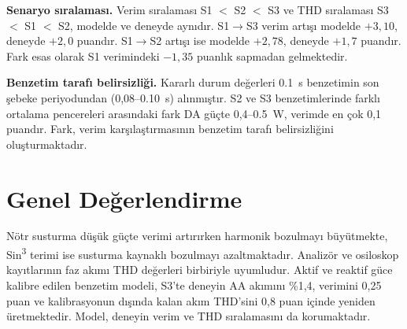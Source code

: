 \textbf{Senaryo sıralaması.} Verim sıralaması S1 $<$ S2 $<$ S3 ve THD sıralaması S3 $<$ S1 $<$ S2, modelde ve deneyde aynıdır. S1$\rightarrow$S3 verim artışı modelde $+3{,}10$, deneyde $+2{,}0$ puandır. S1$\rightarrow$S2 artışı ise modelde $+2{,}78$, deneyde $+1{,}7$ puandır. Fark esas olarak S1 verimindeki $-1{,}35$ puanlık sapmadan gelmektedir.

\textbf{Benzetim tarafı belirsizliği.} Kararlı durum değerleri \SI{0.1}{\second} benzetimin son şebeke periyodundan (0,08--\SI{0.10}{\second}) alınmıştır. S2 ve S3 benzetimlerinde farklı ortalama pencereleri arasındaki fark DA güçte 0,4--\SI{0.5}{\watt}, verimde en çok 0,1 puandır. Fark, verim karşılaştırmasının benzetim tarafı belirsizliğini oluşturmaktadır.


\section{Genel Değerlendirme}

Nötr susturma düşük güçte verimi artırırken harmonik bozulmayı büyütmekte, Sin\textsuperscript{3} terimi ise susturma kaynaklı bozulmayı azaltmaktadır. Analizör ve osiloskop kayıtlarının faz akımı THD değerleri birbiriyle uyumludur. Aktif ve reaktif güce kalibre edilen benzetim modeli, S3'te deneyin AA akımını \%1,4, verimini 0,25 puan ve kalibrasyonun dışında kalan akım THD'sini 0,8 puan içinde yeniden üretmektedir. Model, deneyin verim ve THD sıralamasını da korumaktadır.
